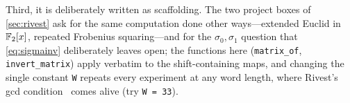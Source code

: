 Third, it is deliberately written as scaffolding. The two project boxes
of \cref{sec:rivest} ask for the same computation done other
ways---extended Euclid in $\mathbb{F}_2[x]$, repeated Frobenius squaring---and
for the $\sigma_0, \sigma_1$ question that \cref{eq:sigmainv}
deliberately leaves open; the functions here (\texttt{matrix\_of},
\texttt{invert\_matrix}) apply verbatim to the shift-containing maps,
and changing the single constant \texttt{W} repeats every experiment at
any word length, where Rivest's gcd condition~\citep{Rivest2011} comes
alive (try \texttt{W = 33}).

\medskip

